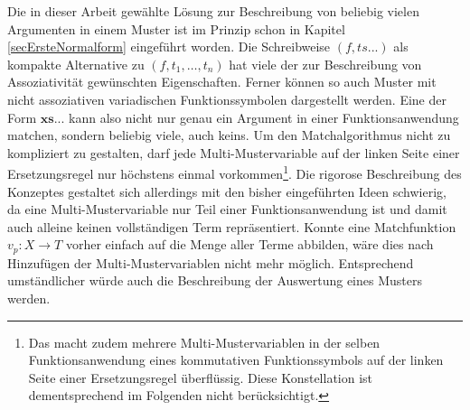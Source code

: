 Die in dieser Arbeit gewählte Lösung zur Beschreibung von beliebig vielen Argumenten in einem Muster ist im Prinzip schon in Kapitel \ref{secErsteNormalform} eingeführt worden. Die Schreibweise $(f, ts...)$ als kompakte Alternative zu $(f, t_1, \dots, t_n)$ hat viele der zur Beschreibung von Assoziativität gewünschten Eigenschaften. Ferner können so auch Muster mit nicht assoziativen variadischen Funktionssymbolen dargestellt werden. Eine  der Form $\mathbf{xs...}$ kann also nicht nur genau ein Argument in einer Funktionsanwendung matchen, sondern beliebig viele, auch keins. Um den Matchalgorithmus nicht zu kompliziert zu gestalten, darf jede Multi-Mustervariable auf der linken Seite einer Ersetzungsregel nur höchstens einmal vorkommen\footnote{Das macht zudem mehrere Multi-Mustervariablen in der selben Funktionsanwendung eines kommutativen Funktionssymbols auf der linken Seite einer Ersetzungsregel überflüssig. Diese Konstellation ist dementsprechend im Folgenden nicht berücksichtigt.}. Die rigorose Beschreibung des Konzeptes gestaltet sich allerdings mit den bisher eingeführten Ideen schwierig, da eine Multi-Mustervariable nur Teil einer Funktionsanwendung ist und damit auch alleine keinen vollständigen Term repräsentiert. Konnte eine Matchfunktion $v_p \colon X \rightarrow T$ vorher einfach auf die Menge aller Terme abbilden, wäre dies nach Hinzufügen der Multi-Mustervariablen nicht mehr möglich. Entsprechend umständlicher würde auch die Beschreibung der Auswertung eines Musters werden. \\

